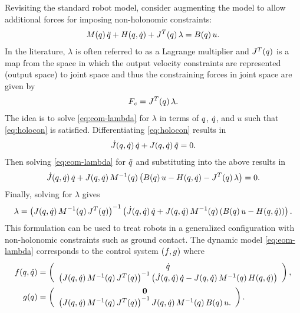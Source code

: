Revisiting the standard robot model, consider augmenting the model to allow
additional forces for imposing non-holonomic constraints:
%
\begin{align}
  \label{eq:eom-lambda}
  M(q) \, \ddot{q} + H(q, \dot{q}) + J^{T}(q) \, \lambda = B(q) \, u.
\end{align}
%
In the literature, $\lambda$ is often referred to as a Lagrange multiplier
\cite[\S 4.10]{Baruh1998} and $J^{T}(q)$ is a map from the space in which
the output velocity constraints are represented (output space) to joint space
and thus the constraining forces in joint space are given by
%
\begin{align*}
  F_{\mathit{c}} = J^{T}(q) \, \lambda.
\end{align*}
The idea is to solve \eqref{eq:eom-lambda} for $\lambda$ in terms of $q$,
$\dot{q}$, and $u$ such that \eqref{eq:holocon} is satisfied.
%
Differentiating \eqref{eq:holocon} results in
\begin{align*}
 {\dot {J}}(q, \dot{q}) \, \dot{q} + J(q, \dot{q}) \, \ddot{q} = 0.
\end{align*}
%
Then solving \eqref{eq:eom-lambda} for $\ddot{q}$ and substituting into the above
results in
\begin{align*}
  {\dot {J}}(q, \dot{q}) \, \dot{q} + J(q, \dot{q}) \, M^{-1}(q) \left(B(q) \, u
    -H(q, \dot{q}) - J^{T}(q) \, \lambda \right) = 0.
\end{align*}
Finally, solving for $\lambda$ gives
\begin{align}
  \label{eq:wrench}
  \lambda = \left( J(q, \dot{q}) \, M^{-1}(q) \, J^{T}(q) \right)^{-1}
  \left( {\dot {J}}(q, \dot{q}) \, \dot{q} + J(q, \dot{q}) \, M^{-1}(q) \left(B(q) \, u
      -H(q, \dot{q})\right) \right).
\end{align}
%
This formulation can be used to treat robots in a generalized configuration
with non-holonomic constraints such as ground contact.
%
The dynamic model \eqref{eq:eom-lambda} corresponds to the control system $(f,
g)$ where
\begin{align}
\nonumber
  f(q, \dot{q}) &= \left(\begin{array}{c}
      \dot{q}\\
      \left( J(q, \dot{q}) \, M^{-1}(q) \, J^{T}(q) \right)^{-1}
      \left( {\dot {J}}(q, \dot{q}) \, \dot{q} - J(q, \dot{q}) \, M^{-1}(q) \, H(q, \dot{q}) \right)
    \end{array}\right),\\
    \label{eq:controlsystem}
  g(q) &= \left(\begin{array}{c}
      {\mathbf 0}\\
      \left( J(q, \dot{q}) \, M^{-1}(q) \, J^{T}(q) \right)^{-1}
      J(q, \dot{q}) \, M^{-1}(q) \, B(q) \, u.
    \end{array}\right).
\end{align}

